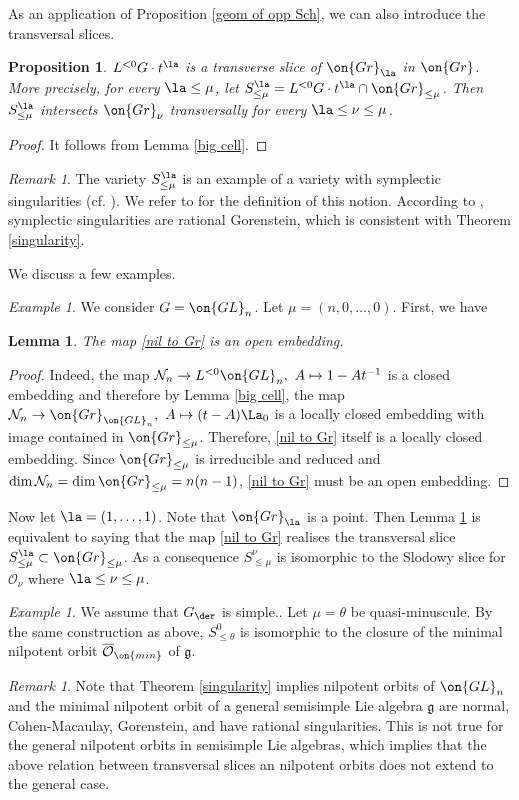 \documentclass[]{pcmi}
\theoremstyle{plain}
\newtheorem{prop}[equation]{Proposition}
\newtheorem{lem}[equation]{Lemma}
\theoremstyle{remark}
\newtheorem{ex}[equation]{Example}
\newtheorem{rmk}[equation]{Remark}
\theoremstyle{definition}
\newcommand{\frakg}{{\mathfrak g}}
\newcommand{\mN}{{\mathcal N}}
\newcommand{\mO}{{\mathcal O}}
\newcommand{\Gr}{{\on{Gr}}}
\newcommand{\GL}{{\on{GL}}}
\begin{document}
As an application of Proposition \ref{geom of opp Sch},  we can also introduce the transversal slices.
\begin{prop}$L^{<0}G\cdot t^\la$ is a transverse slice of $\Gr_\la$ in $\Gr$. More precisely, for every $\la\leq \mu$, let $S^\la_{\leq \mu}=L^{<0}G\cdot t^\la\cap \Gr_{\leq \mu}$. Then $S^\la_{\leq \mu}$
intersects $\Gr_\nu$ transversally for every $\la\leq \nu\leq \mu$.
\end{prop}
\begin{proof}It follows from Lemma \ref{big cell}.
\end{proof}

\begin{rmk}\label{symplectic sing}
The variety $S^\la_{\leq \mu}$ is an example of a variety with symplectic singularities (cf. \cite[Theorem 2.7]{KWWY}). We refer to \cite[Definition 1.1]{Bea} for the definition of this notion. According to \cite[Proposition 1.3]{Bea}, symplectic singularities are rational Gorenstein, which is consistent with Theorem \ref{singularity}.
\end{rmk}
We discuss a few examples.  
\begin{ex}\label{slice GLn}
We consider $G=\GL_n$. Let $\mu=(n,0,\ldots,0)$. First, we have
\begin{lem}\label{Lus obs}
The map \eqref{nil to Gr} is an open embedding.
\end{lem}
\begin{proof}Indeed, the map $\mN_n\to L^{<0}\GL_n,\ A\mapsto 1-At^{-1}$ is a closed embedding and therefore by Lemma \ref{big cell}, the map $\mN_n\to \Gr_{\GL_n},\ A\mapsto (t-A)\La_0$ is a locally closed embedding with image contained in $\Gr_{\leq \mu}$. Therefore, \eqref{nil to Gr} itself is a locally closed embedding. Since $\Gr_{\leq \mu}$ is irreducible and reduced and  $\dim \mN_n=\dim \Gr_{\leq \mu}=n(n-1)$, \eqref{nil to Gr} must be an open embedding. 
\end{proof}
Now let $\la=(1,\ldots,1)$. Note that $\Gr_\la$ is a point. Then Lemma \ref{Lus obs} is equivalent to saying that the map \eqref{nil to Gr} realises the transversal slice $S_{\leq \mu}^\la\subset \Gr_{\leq \mu}$. 
As a consequence $S_{\leq \mu}^\nu$ is isomorphic to the Slodowy slice for $\mO_\nu$ where $\la\leq \nu\leq \mu$.
\end{ex}
\begin{ex}
We assume that $G_\der$ is simple.. Let $\mu=\theta$ be quasi-minuscule. By the same construction as above, 
$S^0_{\leq \theta}$ is isomorphic to the closure of the minimal nilpotent orbit $\overline{\mO}_{\on{min}}$ of $\frakg$.
\end{ex}
\begin{rmk}
Note that Theorem \ref{singularity} implies
nilpotent orbits of $\GL_n$ and the minimal nilpotent orbit of a general semisimple Lie algebra $\frakg$ are normal, Cohen-Macaulay, Gorenstein, and have rational singularities.
This is not true for the general nilpotent orbits in semisimple Lie algebras, which implies that the above relation between transversal slices an nilpotent orbits does not extend to the general case.
\end{rmk}
\end{document}

